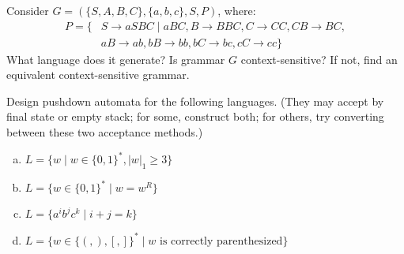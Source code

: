\documentclass[a4paper,12pt]{amsart}
\begin{document}
\medskip\begin{problem}
    
    Consider $G=(\{S,A,B,C\},\{a,b,c\},S,P)$, where:
    \begin{align*}
        P=\{&S\rightarrow aSBC\mid aBC, B\rightarrow BBC,  C\rightarrow CC, CB\rightarrow BC,\\ 
        &aB\rightarrow ab, bB\rightarrow bb, bC\rightarrow bc, cC\rightarrow cc\}
    \end{align*}
    What language does it generate? Is grammar $G$ context-sensitive? If not, find an equivalent context-sensitive grammar.
    
\end{problem}


\medskip\begin{problem}

    Design pushdown automata for the following languages. (They may accept by final state or empty stack; for some, construct both; for others, try converting between these two acceptance methods.)

    \medskip

    \begin{enumerate}[(a)]\setlength\itemsep{9pt}
        \item $L=\{w\mid w\in\{0,1\}^*,|w|_1\geq 3\}$        
        \item $L=\{w\in \{0,1\}^*\mid w=w^R\}$        
        \item $L=\{a^ib^jc^k\mid i+j=k\}$        
        \item $L=\{w\in\{(,),[,]\}^*\mid w\text{ is correctly parenthesized}\}$
    \end{enumerate}

\end{problem}
\end{document}
